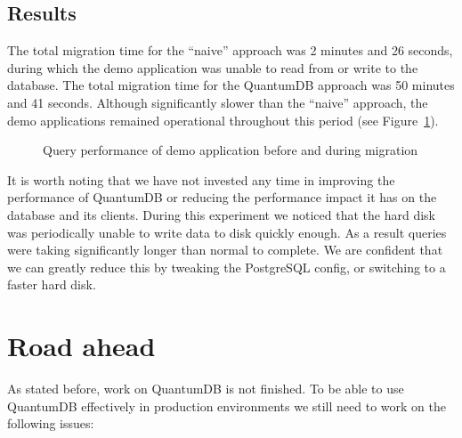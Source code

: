 \documentclass[conference]{IEEEtran}
\begin{document}
\subsection{Results}
\label{sec:results}

The total migration time for the ``naive'' approach was 2 minutes and 26 seconds, during which the demo application was unable to read from or write to the database. The total migration time for the QuantumDB approach was 50 minutes and 41 seconds. Although significantly slower than the ``naive'' approach, the demo applications remained operational throughout this period (see Figure~\ref{fig:migration}).

\begin{figure}%
    \centering
    \qquad
    \caption{Query performance of demo application before and during migration}%
    \label{fig:migration}%
\end{figure}

It is worth noting that we have not invested any time in improving the performance of QuantumDB or reducing the performance impact it has on the database and its clients. During this experiment we noticed that the hard disk was periodically unable to write data to disk quickly enough. As a result queries were taking significantly longer than normal to complete. We are confident that we can greatly reduce this by tweaking the PostgreSQL config, or switching to a faster hard disk.

\section{Road ahead}
As stated before, work on QuantumDB is not finished. To be able to use QuantumDB effectively in production environments we still need to work on the following issues: 
\end{document}
